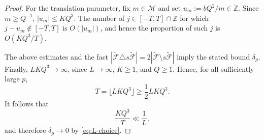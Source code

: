 \documentclass[10pt,a4paper]{amsart}
\newcommand{\Z}{\mathbb Z}
\begin{document}
\begin{proof}
For the translation parameter, fix $m\in\mathcal M$ and set
$u_m:=bQ^2/m\in\Z$.  Since $m\ge Q^{-1}$, $|u_m|\le KQ^3$.  The number of
$j\in[-T,T]\cap\Z$ for which $j-u_m\notin[-T,T]$ is $O(|u_m|)$, and hence the
proportion of such $j$ is $O(KQ^3/T)$.

The above estimates and the fact
$|\widetilde{\mathcal F}\triangle s\widetilde{\mathcal F}|
=2|\widetilde{\mathcal F}\setminus s\widetilde{\mathcal F}|$ imply the stated
bound $\delta_p$. Finally, \(LKQ^3\to\infty\), since \(L\to\infty\), \(K\ge1\), and \(Q\ge1\).
Hence, for all sufficiently large \(p\),
\[
        T=\lfloor LKQ^3\rfloor\ge \frac12 LKQ^3 .
\]
It follows that
\[
        \frac{KQ^3}{T}\ll \frac1L,
\]
and therefore \(\delta_p\to0\) by \eqref{eq:L-choice}.
\end{proof}
\end{document}
